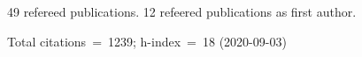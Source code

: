 49 refereed publications. 12 refeered publications as first author.

Total citations~=~1239; h-index~=~18 (2020-09-03)